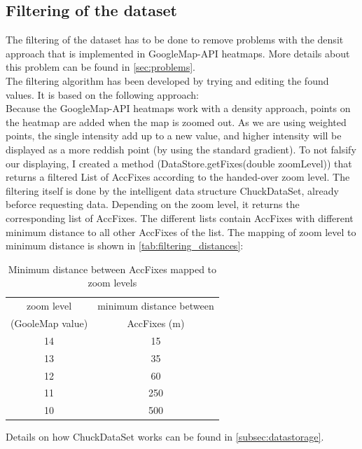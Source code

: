 \documentclass[10pt,a4paper]{article} %
\begin{document}
	\subsection{Filtering of the dataset}\label{subsec:filtering}

	The filtering of the dataset has to be done to remove problems with the densit approach that is implemented in GoogleMap-API heatmaps.
	More details about this problem can be found in \autoref{sec:problems}.\\
	The filtering algorithm has been developed by trying and editing the found values.
	It is based on the following approach:\\
	Because the GoogleMap-API heatmaps work with a density approach, points on the heatmap are added when the map is zoomed out.
	As we are using weighted points, the single intensity add up to a new value, and higher intensity will be displayed as a more reddish point (by using the standard gradient).
	To not falsify our displaying, I created a method (DataStore.getFixes(double zoomLevel)) that returns a filtered List of AccFixes according to the handed-over zoom level.
	The filtering itself is done by the intelligent data structure ChuckDataSet, already beforce requesting data.
	Depending on the zoom level, it returns the corresponding list of AccFixes.
	The different lists contain AccFixes with different minimum distance to all other AccFixes of the list.
	The mapping of zoom level to minimum distance is shown in \autoref{tab:filtering_distances}:

	\begin{table}[H]
	  \centering
 
  
	  \begin{tabular}{c|c}
	    zoom level & minimum distance between\\
		(GooleMap value) 	& AccFixes (m)\\
	    \hline
	    	14 & 15\\
		13 & 35\\
		12 & 60\\
		11 & 250\\
		10 & 500\\
	  \end{tabular}
	   \caption{Minimum distance between AccFixes mapped to zoom levels} 
	   \label{tab:filtering_distances}
	\end{table}

	Details on how ChuckDataSet works can be found in \autoref{subsec:datastorage}. %
\end{document}

